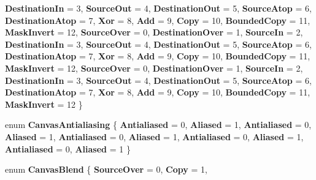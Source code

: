\begin{DoxyCompactItemize}
{\bfseries Destination\+In} = 3, 
{\bfseries Source\+Out} = 4, 
{\bfseries Destination\+Out} = 5, 
\newline
{\bfseries Source\+Atop} = 6, 
{\bfseries Destination\+Atop} = 7, 
{\bfseries Xor} = 8, 
{\bfseries Add} = 9, 
\newline
{\bfseries Copy} = 10, 
{\bfseries Bounded\+Copy} = 11, 
{\bfseries Mask\+Invert} = 12, 
{\bfseries Source\+Over} = 0, 
\newline
{\bfseries Destination\+Over} = 1, 
{\bfseries Source\+In} = 2, 
{\bfseries Destination\+In} = 3, 
{\bfseries Source\+Out} = 4, 
\newline
{\bfseries Destination\+Out} = 5, 
{\bfseries Source\+Atop} = 6, 
{\bfseries Destination\+Atop} = 7, 
{\bfseries Xor} = 8, 
\newline
{\bfseries Add} = 9, 
{\bfseries Copy} = 10, 
{\bfseries Bounded\+Copy} = 11, 
{\bfseries Mask\+Invert} = 12, 
\newline
{\bfseries Source\+Over} = 0, 
{\bfseries Destination\+Over} = 1, 
{\bfseries Source\+In} = 2, 
{\bfseries Destination\+In} = 3, 
\newline
{\bfseries Source\+Out} = 4, 
{\bfseries Destination\+Out} = 5, 
{\bfseries Source\+Atop} = 6, 
{\bfseries Destination\+Atop} = 7, 
\newline
{\bfseries Xor} = 8, 
{\bfseries Add} = 9, 
{\bfseries Copy} = 10, 
{\bfseries Bounded\+Copy} = 11, 
\newline
{\bfseries Mask\+Invert} = 12
 \}
\item 
\mbox{\label{namespace_microsoft_1_1_graphics_1_1_canvas_a3ca0365f7ca6c805554d000be051da7c}} 
enum {\bfseries Canvas\+Antialiasing} \{ \newline
{\bfseries Antialiased} = 0, 
{\bfseries Aliased} = 1, 
{\bfseries Antialiased} = 0, 
{\bfseries Aliased} = 1, 
\newline
{\bfseries Antialiased} = 0, 
{\bfseries Aliased} = 1, 
{\bfseries Antialiased} = 0, 
{\bfseries Aliased} = 1, 
\newline
{\bfseries Antialiased} = 0, 
{\bfseries Aliased} = 1
 \}
\item 
\mbox{\label{namespace_microsoft_1_1_graphics_1_1_canvas_a4d6f8dfcb051c810dfc379d736e689a4}} 
enum {\bfseries Canvas\+Blend} \{ \newline
{\bfseries Source\+Over} = 0, 
{\bfseries Copy} = 1, 

\end{DoxyCompactItemize}
